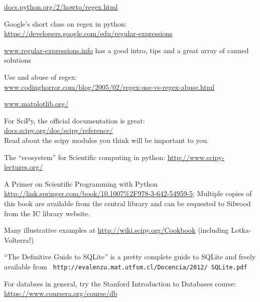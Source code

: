 \begin{compactitem} \itemsep6pt
	\item \url{docs.python.org/2/howto/regex.html}
	\item Google's short class on regex in python:\\
	\url{https://developers.google.com/edu/regular-expressions}
	\item \url{www.regular-expressions.info} has a good intro, tips and 
	a great array of canned solutions
	\item Use and abuse of regex:\\ 
\url{www.codinghorror.com/blog/2005/02/regex-use-vs-regex-abuse.html}   

	\item \url{www.matplotlib.org/}
	\item For SciPy, the official documentation is great:\\
\url{docs.scipy.org/doc/scipy/reference/}\\
	Read about the scipy modules you think will be important to you. 
	
	\item The ``ecosystem'' for Scientific computing in python: 
	\url{http://www.scipy-lectures.org/}

	\item A Primer on Scientific Programming with Python 
	\url{http://link.springer.com/book/10.1007\%2F978-3-642-54959-5}; 
	Multiple copies of this book are available from the central library 
	and can be requested to Silwood from the IC library website.  

	\item Many illustrative examples at 
	\url{http://wiki.scipy.org/Cookbook} (including Lotka-Volterra!)

	\item ``The Definitive Guide to SQLite'' is a pretty complete guide 
	to SQLite and freely available from {\tt 
	http://evalenzu.mat.utfsm.cl/Docencia/2012/ SQLite.pdf}
	\item For databses in general, try the Stanford Introduction to 
	Databases course: \url{https://www.coursera.org/course/db} 

\end{compactitem}
